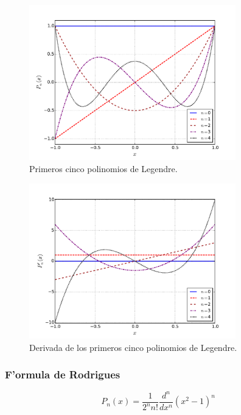 \begin{figure}[H]
\centering
\includegraphics[angle=0,width=0.8\textwidth]{figs/fig-Legendre-P.pdf}
\caption{Primeros cinco polinomios de Legendre.}
\label{fig-Pn}
\end{figure}

\begin{figure}[H]
\centering
\includegraphics[angle=0,width=0.8\textwidth]{figs/fig-Legendre-der-P.pdf}
\caption{Derivada de los primeros cinco polinomios de Legendre.}
\label{fig-Pnp}
\end{figure}



\subsubsection{F'ormula de Rodrigues}

\begin{equation}
P_{n}(x)=\frac{1}{2^{n}n!}\frac{d^{n}}{dx^{n}}(x^2-1)^{n}
\end{equation}


